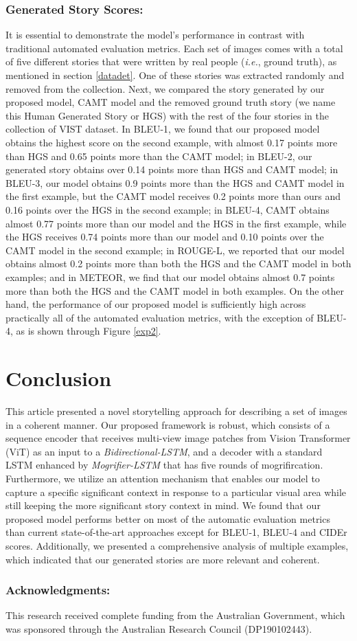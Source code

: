 \documentclass[runningheads]{llncs}
\begin{document}
\subsubsection{Generated Story Scores:}It is essential to demonstrate the model's performance in contrast with traditional automated evaluation metrics. Each set of images comes with a total of five different stories that were written by real people (\emph{i.e.}, ground truth), as mentioned in section \ref{datadet}. One of these stories was extracted randomly and removed from the collection. Next, we compared the story generated by our proposed model, CAMT model and the removed ground truth story (we name this Human Generated Story or HGS) with the rest of the four stories in the collection of VIST dataset. In BLEU-1, we found that our proposed model obtains the highest score on the second example, with almost 0.17 points more than HGS and 0.65 points more than the CAMT model; in BLEU-2, our generated story obtains over 0.14 points more than HGS and CAMT model; in BLEU-3, our model obtains 0.9 points more than the HGS and CAMT model in the first example, but the CAMT model receives 0.2 points more than ours and 0.16 points over the HGS in the second example; in BLEU-4, CAMT obtains almost 0.77 points more than our model and the HGS in the first example, while the HGS receives 0.74 points more than our model and 0.10 points over the CAMT model in the second example; in ROUGE-L, we reported that our model obtains almost 0.2 points more than both the HGS and the CAMT model in both examples; and in METEOR, we find that our model obtains almost 0.7 points more than both the HGS and the CAMT model in both examples. On the other hand, the performance of our proposed model is sufficiently high across practically all of the automated evaluation metrics, with the exception of BLEU-4, as is shown through Figure \ref{exp2}.


\section{Conclusion}
This article presented a novel storytelling approach for describing a set of images in a coherent manner. Our proposed framework is robust, which consists of a sequence encoder that receives multi-view image patches from Vision Transformer (ViT) as an input to a {\em Bidirectional-LSTM}, and a decoder with a standard LSTM enhanced by {\em Mogrifier-LSTM} that has five rounds of mogrifircation. Furthermore, we utilize an attention mechanism that enables our model to capture a specific significant context in response to a particular visual area while still keeping the more significant story context in mind. We found that our proposed model performs better on most of the automatic evaluation metrics than current state-of-the-art approaches except for BLEU-1, BLEU-4 and CIDEr scores. Additionally, we presented a comprehensive analysis of multiple examples, which indicated that our generated stories are more relevant and coherent.

\subsubsection*{Acknowledgments:}
This research received complete funding from the Australian Government, which was sponsored through the Australian Research Council (DP190102443).





\end{document}
